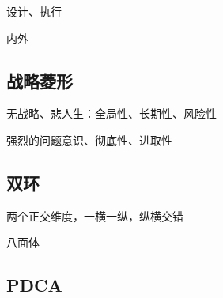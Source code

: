 设计、执行

内外

\subsection{战略菱形}

无战略、悲人生：全局性、长期性、风险性

强烈的问题意识、彻底性、进取性

\subsection{双环}

两个正交维度，一横一纵，纵横交错

八面体

\subsection{PDCA}
